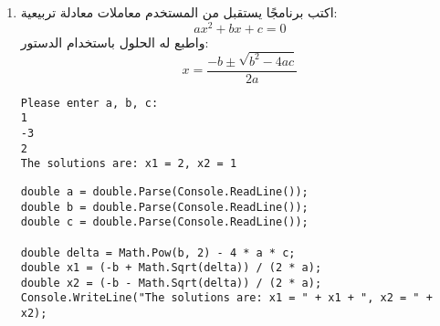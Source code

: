 \documentclass[12pt]{article}
\begin{document}
\begin{enumerate}[itemsep=3em]
    \item
    اكتب برنامجًا يستقبل من المستخدم معاملات معادلة تربيعية:
    \[
        ax^2 + bx + c = 0
        \]
        واطبع له الحلول باستخدام الدستور:
        \[
            x = \frac{-b \pm \sqrt{b^2 - 4ac}}{2a}
            \]
            \ifdetailed
            \begin{example}
                \begin{english}
                    \begin{lstlisting}
Please enter a, b, c:
1
-3
2
The solutions are: x1 = 2, x2 = 1
\end{lstlisting}
\end{english}
\end{example}
\ifwithsols
\begin{solution}
    \begin{english}
    \begin{lstlisting}
double a = double.Parse(Console.ReadLine());
double b = double.Parse(Console.ReadLine());
double c = double.Parse(Console.ReadLine());

double delta = Math.Pow(b, 2) - 4 * a * c;
double x1 = (-b + Math.Sqrt(delta)) / (2 * a);
double x2 = (-b - Math.Sqrt(delta)) / (2 * a);
Console.WriteLine("The solutions are: x1 = " + x1 + ", x2 = " + x2);
            \end{lstlisting}
        \end{english}
    \end{solution}
    \fi
    \fi


\end{enumerate}
\end{document}
